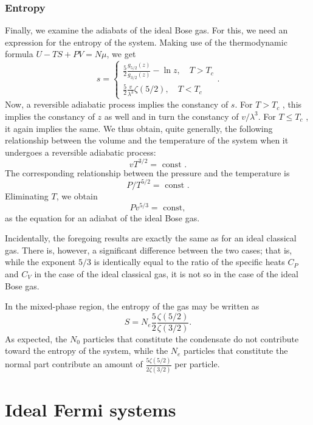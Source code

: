 \subsubsection{Entropy}
Finally, we examine the adiabats of the ideal Bose gas. For this, we need an expression for the entropy of the system. Making use of the thermodynamic formula $U - TS + PV = N\mu$, we get
\[s = \begin{cases}\frac{5}{2}\frac{g_{5/2}(z)}{g_{3/2}(z)} -\ln z , \quad T>T_c \\\frac{5}{2} \frac{v}{\lambda^3}\zeta(5/2) , \quad T < T_c  \end{cases}.\]
Now, a reversible adiabatic process implies the constancy of $s$. For $T > T_c$ , this implies the constancy of $z$ as well and in turn the constancy of $v/\lambda^3$. For $T \leq T_c$ , it again implies the same. We thus obtain, quite generally, the following relationship between the volume and the temperature of the system when it undergoes a reversible adiabatic process:
\[vT^{3/2} = \mbox{ const }.\]
The corresponding relationship between the pressure and the temperature is
\[P/T^{5/2} = \mbox{ const }.\]
Eliminating $T$, we obtain
\[Pv^{5/3} = \mbox{ const},\]
as the equation for an adiabat of the ideal Bose gas.
\begin{note}
Incidentally, the foregoing results are exactly the same as for an ideal classical gas. There is, however, a significant difference between the two cases; that is, while the exponent $5/3$ is identically equal to the ratio of the specific heats $C_P$ and $C_V$ in the case of the ideal classical gas, it is not so in the case of the ideal Bose gas.
\end{note}
\noindent
In the mixed-phase region, the entropy of the gas may be written as
\[S = N_e \frac{5}{2} \frac{\zeta(5/2)}{\zeta(3/2)}.\]
As expected, the $N_0$ particles that constitute the condensate do not contribute toward the entropy of the system, while the $N_e$ particles that constitute the normal part contribute an amount of $\frac{5\zeta(5/2)}{2\zeta(3/2)}$ per particle.

\section{Ideal Fermi systems}
